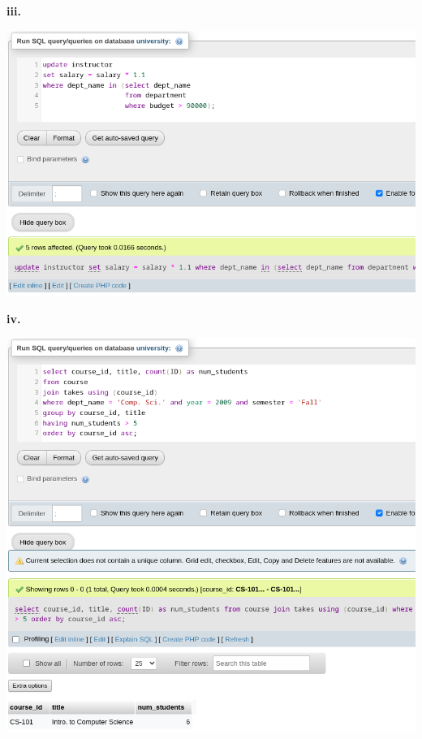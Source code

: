\documentclass{article}
\begin{document}
\newpage
\textbf{iii.}
    \begin{center}
    \includegraphics[scale=0.6]{8iii.png}
\end{center}
\newpage
\textbf{iv.}
    \begin{center}
    \includegraphics[scale=0.6]{8iv.png}
\end{center}
\end{document}

